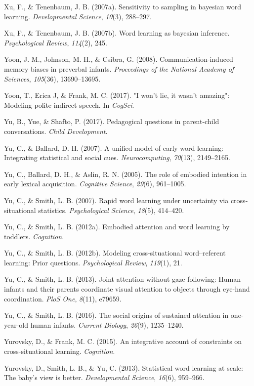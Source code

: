 \documentclass[oneside]{report}
\begin{document}
\leavevmode\hypertarget{ref-xu2007sampling}{}%
Xu, F., \& Tenenbaum, J. B. (2007a). Sensitivity to sampling in bayesian
word learning. \emph{Developmental Science}, \emph{10}(3), 288--297.

\leavevmode\hypertarget{ref-xu2007word}{}%
Xu, F., \& Tenenbaum, J. B. (2007b). Word learning as bayesian
inference. \emph{Psychological Review}, \emph{114}(2), 245.

\leavevmode\hypertarget{ref-yoon2008communication}{}%
Yoon, J. M., Johnson, M. H., \& Csibra, G. (2008). Communication-induced
memory biases in preverbal infants. \emph{Proceedings of the National
Academy of Sciences}, \emph{105}(36), 13690--13695.

\leavevmode\hypertarget{ref-yoonwon}{}%
Yoon, T., Erica J, \& Frank, M. C. (2017). "I won't lie, it wasn't
amazing": Modeling polite indirect speech. In \emph{CogSci}.

\leavevmode\hypertarget{ref-yu2017peagogical}{}%
Yu, B., Yue, \& Shafto, P. (2017). Pedagogical questions in parent-child
conversations. \emph{Child Development}.

\leavevmode\hypertarget{ref-yu2007unified}{}%
Yu, C., \& Ballard, D. H. (2007). A unified model of early word
learning: Integrating statistical and social cues.
\emph{Neurocomputing}, \emph{70}(13), 2149--2165.

\leavevmode\hypertarget{ref-yu2005role}{}%
Yu, C., Ballard, D. H., \& Aslin, R. N. (2005). The role of embodied
intention in early lexical acquisition. \emph{Cognitive Science},
\emph{29}(6), 961--1005.

\leavevmode\hypertarget{ref-yu2007rapid}{}%
Yu, C., \& Smith, L. B. (2007). Rapid word learning under uncertainty
via cross-situational statistics. \emph{Psychological Science},
\emph{18}(5), 414--420.

\leavevmode\hypertarget{ref-yu2012embodied}{}%
Yu, C., \& Smith, L. B. (2012a). Embodied attention and word learning by
toddlers. \emph{Cognition}.

\leavevmode\hypertarget{ref-yu2012modeling}{}%
Yu, C., \& Smith, L. B. (2012b). Modeling cross-situational
word--referent learning: Prior questions. \emph{Psychological Review},
\emph{119}(1), 21.

\leavevmode\hypertarget{ref-yu2013joint}{}%
Yu, C., \& Smith, L. B. (2013). Joint attention without gaze following:
Human infants and their parents coordinate visual attention to objects
through eye-hand coordination. \emph{PloS One}, \emph{8}(11), e79659.

\leavevmode\hypertarget{ref-yu2016social}{}%
Yu, C., \& Smith, L. B. (2016). The social origins of sustained
attention in one-year-old human infants. \emph{Current Biology},
\emph{26}(9), 1235--1240.

\leavevmode\hypertarget{ref-yurovsky2014algorithmic}{}%
Yurovsky, D., \& Frank, M. C. (2015). An integrative account of
constraints on cross-situational learning. \emph{Cognition}.

\leavevmode\hypertarget{ref-yurovsky2013statistical}{}%
Yurovsky, D., Smith, L. B., \& Yu, C. (2013). Statistical word learning
at scale: The baby's view is better. \emph{Developmental Science},
\emph{16}(6), 959--966.


\end{document}
